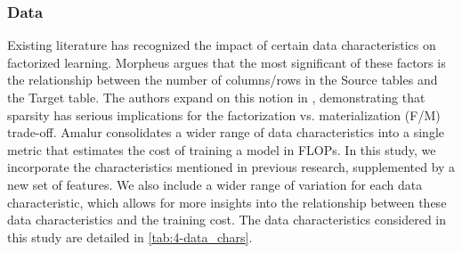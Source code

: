 \subsubsection{Data}
Existing literature has recognized the impact of certain data characteristics on factorized learning. Morpheus \cite{morpheus} argues that the most significant of these factors is the relationship between the number of columns/rows in the Source tables and the Target table. The authors expand on this notion in \cite{MorpheusFI}, demonstrating that sparsity has serious implications for the factorization vs. materialization (F/M) trade-off. Amalur \cite{schijndel_cost_estimation} consolidates a wider range of data characteristics into a single metric that estimates the cost of training a model in FLOPs. In this study, we incorporate the characteristics mentioned in previous research, supplemented by a new set of features. We also include a wider range of variation for each data characteristic, which allows for more insights into the relationship between these data characteristics and the training cost. The data characteristics considered in this study are detailed in \autoref{tab:4-data_chars}.

